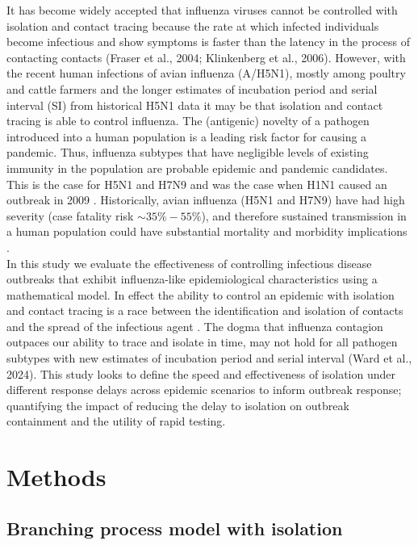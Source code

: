 \documentclass{article}
\begin{document}
It has become widely accepted that influenza viruses cannot be controlled with isolation and contact tracing because the rate at which infected individuals become infectious and show symptoms is faster than the latency in the process of contacting contacts (Fraser et al., 2004; Klinkenberg et al., 2006). However, with the recent human infections of avian influenza (A/H5N1), mostly among poultry and cattle farmers \citep{gargHighlyPathogenicAvian2025} and the longer estimates of incubation period and serial interval (SI) from historical H5N1 data \citep{Ward2024.12.11.24318702} it may be that isolation and contact tracing is able to control influenza. The (antigenic) novelty of a pathogen introduced into a human population is a leading risk factor for causing a pandemic. Thus, influenza subtypes that have negligible levels of existing immunity in the population are probable epidemic and pandemic candidates. This is the case for H5N1 and H7N9 \citep{tannerPandemicPotentialAvian2015} and was the case when H1N1 caused an outbreak in 2009 \citep{fraserPandemicPotentialStrain2009}. Historically, avian influenza (H5N1 and H7N9) have had high severity (case fatality risk $\sim 35\%-55\%$), and therefore sustained transmission in a human population could have substantial mortality and morbidity implications \citep{tannerPandemicPotentialAvian2015}. \\

In this study we evaluate the effectiveness of controlling infectious disease outbreaks that exhibit influenza-like epidemiological characteristics using a mathematical model. In effect the ability to control an epidemic with isolation and contact tracing is a race between the identification and isolation of contacts and the spread of the infectious agent \citep{reyna-laraVirusSpreadContact2021}. The dogma that influenza contagion outpaces our ability to trace and isolate in time, may not hold for all pathogen subtypes with new estimates of incubation period and serial interval (Ward et al., 2024). This study looks to define the speed and effectiveness of isolation under different response delays across epidemic scenarios to inform outbreak response; quantifying the impact of reducing the delay to isolation on outbreak containment and the utility of rapid testing.

\section*{Methods}

\subsection*{Branching process model with isolation}
\end{document}
